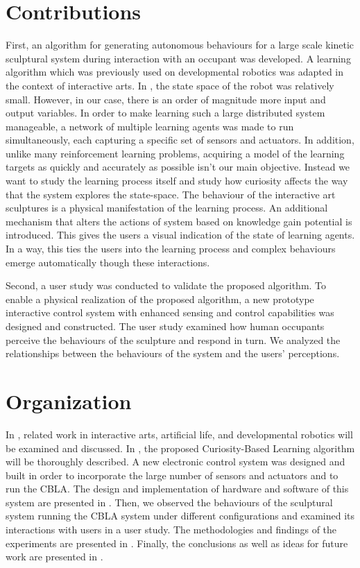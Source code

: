 \section{Contributions}

First, an algorithm for generating autonomous behaviours for a large scale kinetic sculptural system during interaction with an occupant was developed. A learning algorithm which was previously used on developmental robotics was adapted in the context of interactive arts. In \cite{Oudeyer2007}, the state space of the robot was relatively small. However, in our case, there is an order of magnitude more input and output variables. In order to make learning such a large distributed system manageable, a network of multiple learning agents was made to run simultaneously, each capturing a specific set of sensors and actuators. In addition, unlike many reinforcement learning problems, acquiring a model of the learning targets as quickly and accurately as possible isn't our main objective. Instead we want to study the learning process itself and study how curiosity affects the way that the system explores the state-space. The behaviour of the interactive art sculptures is a physical manifestation of the learning process. An additional mechanism that alters the actions of system based on knowledge gain potential is introduced. This gives the users a visual indication of the state of learning agents. In a way, this ties the users into the learning process and complex behaviours emerge automatically though these interactions. 

Second, a user study was conducted to validate the proposed algorithm. To enable a physical realization of the proposed algorithm, a new prototype interactive control system with enhanced sensing and control capabilities was designed and constructed. The user study examined how human occupants perceive the behaviours of the sculpture and respond in turn. We analyzed the relationships between the behaviours of the system and the users' perceptions. 


\section{Organization}

In , related work in interactive arts, artificial life, and developmental robotics will be examined and discussed. In , the proposed Curiosity-Based Learning algorithm will be thoroughly described. A new electronic control system was designed and built in order to incorporate the large number of sensors and actuators and to run the CBLA. The design and implementation of hardware and software of this system are presented in . Then, we observed the behaviours of the sculptural system running the CBLA system under different configurations and examined its interactions with users in a user study. The methodologies and findings of the experiments are presented in . Finally, the conclusions as well as ideas for future work are presented in .
